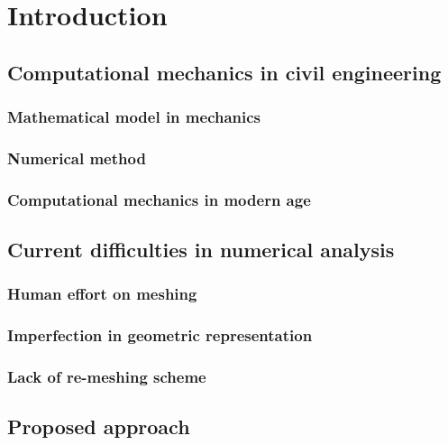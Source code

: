 
\chapter{Introduction}

\section{Computational mechanics in civil engineering}

    \subsection{Mathematical model in mechanics}

    \subsection{Numerical method}

    \subsection{Computational mechanics in modern age}

\section{Current difficulties in numerical analysis}

    \subsection{Human effort on meshing}

    \subsection{Imperfection in geometric representation}

    \subsection{Lack of re-meshing scheme}

\section{Proposed approach}
\paragraph{}



